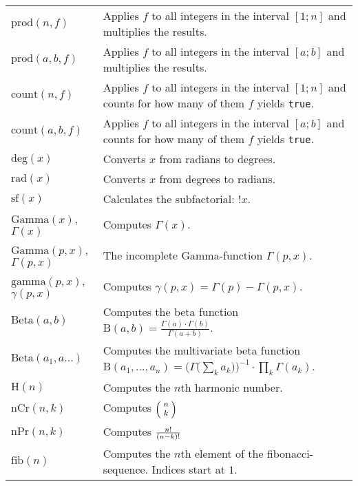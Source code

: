 \documentclass[10pt]{article}
\newcommand{\tabgap}{\vspace{3mm}\\}
\begin{document}
\begin{longtable}{p{}p{}}
        $ \mathrm{prod}(n, f) $                    & Applies $ f $ to all integers in the interval $ [1;n] $ and multiplies the results. \\
        $ \mathrm{prod}(a, b, f) $                 & Applies $ f $ to all integers in the interval $ [a;b] $ and multiplies the results. \\
        $ \mathrm{count}(n, f) $                   & Applies $ f $ to all integers in the interval $ [1;n] $ and counts for how many of them $ f $ yields \verb|true|. \\
        $ \mathrm{count}(a, b, f) $                & Applies $ f $ to all integers in the interval $ [a;b] $ and counts for how many of them $ f $ yields \verb|true|. \tabgap
        $ \mathrm{deg}(x) $                        & Converts $ x $ from radians to degrees. \\
        $ \mathrm{rad}(x) $                        & Converts $ x $ from degrees to radians. \tabgap
        $ \mathrm{sf}(x) $                         & Calculates the subfactorial: $ !x $. \\
        $ \mathrm{Gamma}(x) $, $ \Gamma(x) $       & Computes $ \Gamma(x) $. \\
        $ \mathrm{Gamma}(p, x) $, $ \Gamma(p, x) $ & The incomplete Gamma-function $ \Gamma(p, x) $. \\
        $ \mathrm{gamma}(p, x) $, $ \gamma(p, x) $ & Computes $ \gamma(p, x) = \Gamma(p) - \Gamma(p, x) $. \\
        $ \mathrm{Beta}(a, b) $                    & Computes the beta function $ \mathrm{B}(a, b) = \frac{\Gamma(a) \cdot \Gamma(b)}{\Gamma(a + b)} $. \\
        $ \mathrm{Beta}(a_1, a...) $               & Computes the multivariate beta function $ \mathrm{B}(a_1, \dots, a_n) = \Big(\Gamma\big(\sum_k a_k\big)\Big)^{-1} \cdot \prod_k \Gamma(a_k) $. \\
        $ \mathrm{H}(n) $                          & Computes the $ n $th harmonic number. \tabgap
        $ \mathrm{nCr}(n, k) $                     & Computes $ \footnotesize\Bigl(\kern-2\nulldelimiterspace\begin{array}{c}n\\k\end{array}\kern-2\nulldelimiterspace\Bigr) $ \\
        $ \mathrm{nPr}(n, k) $                     & Computes $ \footnotesize\frac{n!}{(n-k)!} $ \\
        $ \mathrm{fib}(n) $                        & Computes the $ n $th element of the fibonacci-sequence. Indices start at $ 1 $. \\

\end{longtable}
\end{document}
